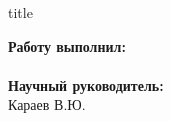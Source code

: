\begin{frame}[plain]
	\begin{center}
		\small{\insertinstitute}
		\vspace{1cm}
	\end{center}
		\begin{beamercolorbox}[sep=8pt,center]{title}
			\inserttitle
		\end{beamercolorbox}
		\vspace{0.1cm}
	\begin{flushright}
		\normalsize \textbf{Работу выполнил:}\\
		\large
		\insertauthor \\
		\vspace{0.5cm}
		\normalsize{\textbf{Научный руководитель:}\\}
		\large{Караев В.Ю.}
		\vfill
	\end{flushright}

	\centering{\small{\today }}
\end{frame}

